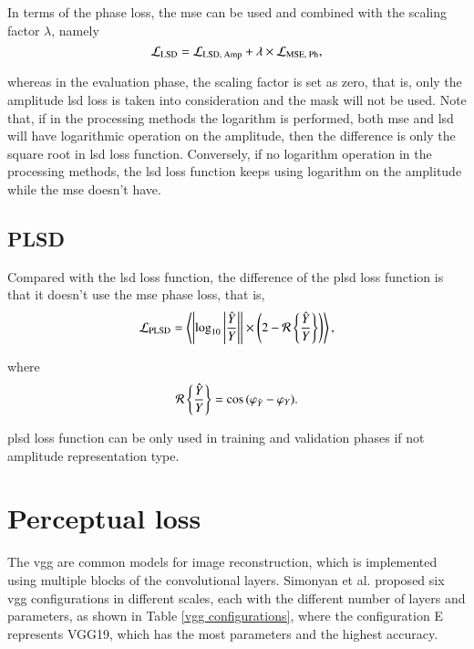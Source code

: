 In terms of the phase loss, the \gls{mse} can be used and combined with the scaling factor $\lambda$, namely
\begin{equation}
    \centering
    \mathcal{L}_{\text{LSD}} = \mathcal{L}_{\text{LSD, Amp}} + \lambda \times \mathcal{L}_{\text{MSE, Ph}},
\end{equation}

whereas in the evaluation phase, the scaling factor is set as zero, that is, only the amplitude \gls{lsd} loss is taken into consideration and the mask will not be used. Note that, if in the processing methods the logarithm is performed, both \gls{mse} and \gls{lsd} will have logarithmic operation on the amplitude, then the difference is only the square root in \gls{lsd} loss function. Conversely, if no logarithm operation in the processing methods, the \gls{lsd} loss function keeps using logarithm on the amplitude while the \gls{mse} doesn't have.

\subsection{PLSD}
Compared with the \gls{lsd} loss function, the difference of the \gls{plsd} loss function is that it doesn't use the \gls{mse} phase loss, that is,
\begin{equation}
    \centering
    \mathcal{L}_{\text{PLSD}} = \left\langle \left| \log_{10} \left| \frac{\hat{Y}}{Y} \right| \right| \times \left( 2 - \mathcal{R} \left\{ \frac{\hat{Y}}{Y} \right\} \right) \right\rangle,
\end{equation}

where
\begin{equation}
    \centering
    \mathcal{R} \left\{ \frac{\hat{Y}}{Y} \right\} = \cos{(\varphi_{\hat{Y}} - \varphi_{Y})}.
\end{equation}

\gls{plsd} loss function can be only used in training and validation phases if not amplitude representation type.

\section{Perceptual loss} \label{perceptual loss}
The \gls{vgg} \cite{simonyan_very_2015} are common models for image reconstruction, which is implemented using multiple blocks of the convolutional layers. Simonyan et al. proposed six \gls{vgg} configurations in different scales, each with the different number of layers and parameters, as shown in Table \ref{vgg configurations}, where the configuration E represents VGG19, which has the most parameters and the highest accuracy.

